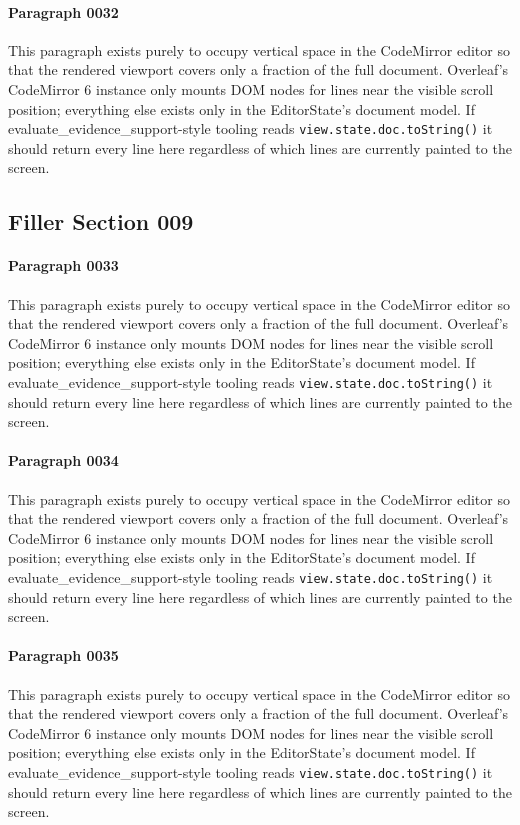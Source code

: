 \documentclass{article}
\begin{document}
\paragraph{Paragraph 0032}
This paragraph exists purely to occupy vertical space in the CodeMirror editor so that the rendered viewport covers only a fraction of the full document. Overleaf's CodeMirror 6 instance only mounts DOM nodes for lines near the visible scroll position; everything else exists only in the EditorState's document model. If evaluate\_evidence\_support-style tooling reads \texttt{view.state.doc.toString()} it should return every line here regardless of which lines are currently painted to the screen.

\subsection{Filler Section 009}
\paragraph{Paragraph 0033}
This paragraph exists purely to occupy vertical space in the CodeMirror editor so that the rendered viewport covers only a fraction of the full document. Overleaf's CodeMirror 6 instance only mounts DOM nodes for lines near the visible scroll position; everything else exists only in the EditorState's document model. If evaluate\_evidence\_support-style tooling reads \texttt{view.state.doc.toString()} it should return every line here regardless of which lines are currently painted to the screen.

\paragraph{Paragraph 0034}
This paragraph exists purely to occupy vertical space in the CodeMirror editor so that the rendered viewport covers only a fraction of the full document. Overleaf's CodeMirror 6 instance only mounts DOM nodes for lines near the visible scroll position; everything else exists only in the EditorState's document model. If evaluate\_evidence\_support-style tooling reads \texttt{view.state.doc.toString()} it should return every line here regardless of which lines are currently painted to the screen.

\paragraph{Paragraph 0035}
This paragraph exists purely to occupy vertical space in the CodeMirror editor so that the rendered viewport covers only a fraction of the full document. Overleaf's CodeMirror 6 instance only mounts DOM nodes for lines near the visible scroll position; everything else exists only in the EditorState's document model. If evaluate\_evidence\_support-style tooling reads \texttt{view.state.doc.toString()} it should return every line here regardless of which lines are currently painted to the screen.
\end{document}
